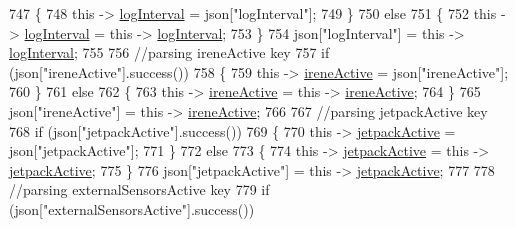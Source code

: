 \begin{DoxyCode}
747             \{
748                 \textcolor{keyword}{this} -> \hyperlink{class_cool_board_a84bc94413b64973e4aba8c467c97006c}{logInterval} = json[\textcolor{stringliteral}{"logInterval"}];
749             \}
750             \textcolor{keywordflow}{else}
751             \{
752                 \textcolor{keyword}{this} -> \hyperlink{class_cool_board_a84bc94413b64973e4aba8c467c97006c}{logInterval} = \textcolor{keyword}{this} -> \hyperlink{class_cool_board_a84bc94413b64973e4aba8c467c97006c}{logInterval};
753             \}
754             json[\textcolor{stringliteral}{"logInterval"}] = \textcolor{keyword}{this} -> \hyperlink{class_cool_board_a84bc94413b64973e4aba8c467c97006c}{logInterval};
755             
756             \textcolor{comment}{//parsing ireneActive key           }
757             \textcolor{keywordflow}{if} (json[\textcolor{stringliteral}{"ireneActive"}].success())
758             \{
759                 \textcolor{keyword}{this} -> \hyperlink{class_cool_board_a9c3f7ac625481ee2ae802a25d97a4ae0}{ireneActive} = json[\textcolor{stringliteral}{"ireneActive"}];
760             \}
761             \textcolor{keywordflow}{else}
762             \{
763                 \textcolor{keyword}{this} -> \hyperlink{class_cool_board_a9c3f7ac625481ee2ae802a25d97a4ae0}{ireneActive} = \textcolor{keyword}{this} -> \hyperlink{class_cool_board_a9c3f7ac625481ee2ae802a25d97a4ae0}{ireneActive};
764             \}
765             json[\textcolor{stringliteral}{"ireneActive"}] = \textcolor{keyword}{this} -> \hyperlink{class_cool_board_a9c3f7ac625481ee2ae802a25d97a4ae0}{ireneActive};
766             
767             \textcolor{comment}{//parsing jetpackActive key}
768             \textcolor{keywordflow}{if} (json[\textcolor{stringliteral}{"jetpackActive"}].success())
769             \{
770                 \textcolor{keyword}{this} -> \hyperlink{class_cool_board_a9be03a913d26e558328935ca3b59a75e}{jetpackActive} = json[\textcolor{stringliteral}{"jetpackActive"}];
771             \}
772             \textcolor{keywordflow}{else}
773             \{
774                 \textcolor{keyword}{this} -> \hyperlink{class_cool_board_a9be03a913d26e558328935ca3b59a75e}{jetpackActive} = \textcolor{keyword}{this} -> \hyperlink{class_cool_board_a9be03a913d26e558328935ca3b59a75e}{jetpackActive};
775             \}
776             json[\textcolor{stringliteral}{"jetpackActive"}] = \textcolor{keyword}{this} -> \hyperlink{class_cool_board_a9be03a913d26e558328935ca3b59a75e}{jetpackActive};
777 
778             \textcolor{comment}{//parsing externalSensorsActive key}
779             \textcolor{keywordflow}{if} (json[\textcolor{stringliteral}{"externalSensorsActive"}].success())

\end{DoxyCode}
